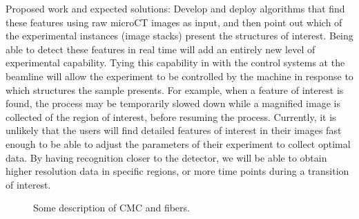 Proposed work and expected solutions: Develop and deploy algorithms that find these features using raw microCT images as input, and then point out which of the experimental instances (image stacks) present the structures of interest. Being able to detect these features in real time will add an entirely new level of experimental capability. Tying this capability in with the control systems at the beamline will allow the experiment to be controlled by the machine in response to which structures the sample presents. For example, when a feature of interest is found, the process may be temporarily slowed down while a magnified image is collected of the region of interest, before resuming the process. Currently, it is unlikely that the users will find detailed features of interest in their images fast enough to be able to adjust the parameters of their experiment to collect optimal data. By having recognition closer to the detector, we will be able to obtain higher resolution data in specific regions, or more time points during a transition of interest.


\cite{IEEEBigData:2014}


\begin{figure}[!t]
\centering
{}
{}
\caption{Some description of CMC and fibers.}
\label{fig:microct}
\end{figure}
